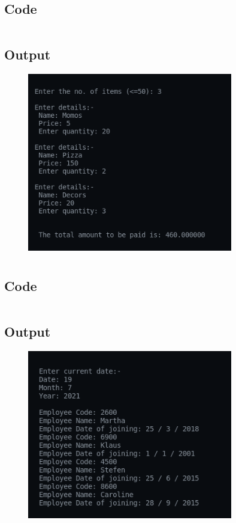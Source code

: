 \documentclass[12pt]{article}
\begin{document}
\newpage
\section{}
\subsection{Code}
\inputminted{c}{q6.c}
\newpage
\subsection{Output}
\begin{figure}[h]
    \centering
    \includegraphics[width=0.8\textwidth]{6.png}
\end{figure}

\newpage
\section{}
\subsection{Code}
\inputminted{c}{q7.c}
\subsection{Output}
\begin{figure}[h]
    \centering
    \includegraphics[width=0.8\textwidth]{7.png}
\end{figure}
\end{document}
